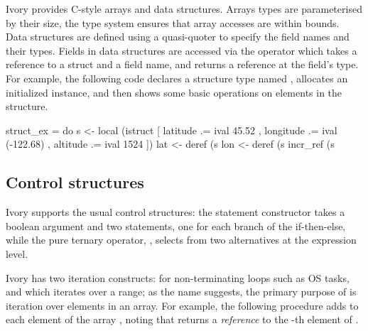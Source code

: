 Ivory provides C-style arrays and data structures.  Arrays types are
parameterised by their size, the type system ensures that array accesses
are within bounds.  Data structures are defined using a quasi-quoter
to specify the field names and their types.  Fields in data structures
are accessed via the \cd{\mytilde>} operator which takes a
reference to a struct and a field name, and returns a reference at the
field's type. For example, the following code declares a structure
type named , allocates an initialized instance, and then
shows some basic operations on elements in the structure.

\begin{code}

struct_ex = do
  s <- local (istruct [ latitude  .= ival 45.52
                      , longitude .= ival (-122.68)
                      , altitude  .= ival 1524 ])
  lat <- deref (s %
  lon <- deref (s %
  incr_ref (s %
\end{code}

\subsection{Control structures}
\label{sec:control}

Ivory supports the usual control structures: the  statement
constructor takes a boolean argument and two statements, one for each
branch of the if-then-else, while the pure ternary operator, ,
selects from two alternatives at the expression level.

Ivory has two iteration constructs:  for non-terminating
loops such as OS tasks, and  which iterates over a range;
as the name suggests, the primary purpose of  is
iteration over elements in an array.  For example, the following
procedure adds  to each element of the array , noting
that  returns a \emph{reference} to the -th
element of .

